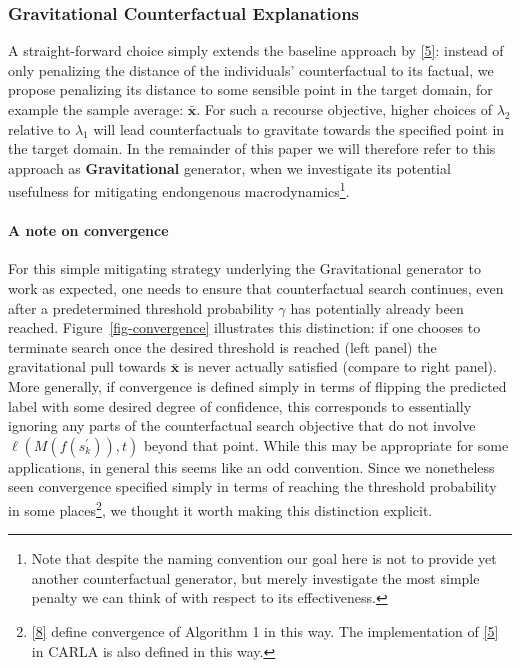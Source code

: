 \documentclass[
  conference]{IEEEtran}
\let\oldparagraph\paragraph
\renewcommand{\paragraph}[1]{\oldparagraph{#1}\mbox{}}
\begin{document}
\hypertarget{sec-empirical-2-mitigate}{%
\subsubsection{Gravitational Counterfactual
Explanations}\label{sec-empirical-2-mitigate}}

A straight-forward choice simply extends the baseline approach by
\protect\hyperlink{ref-wachter2017counterfactual}{{[}5{]}}: instead of
only penalizing the distance of the individuals' counterfactual to its
factual, we propose penalizing its distance to some sensible point in
the target domain, for example the sample average: \(\bar{\mathbf{x}}\).
For such a recourse objective, higher choices of \(\lambda_2\) relative
to \(\lambda_1\) will lead counterfactuals to gravitate towards the
specified point in the target domain. In the remainder of this paper we
will therefore refer to this approach as \textbf{Gravitational}
generator, when we investigate its potential usefulness for mitigating
endongenous macrodynamics\footnote{Note that despite the naming
  convention our goal here is not to provide yet another counterfactual
  generator, but merely investigate the most simple penalty we can think
  of with respect to its effectiveness.}.

\hypertarget{a-note-on-convergence}{%
\paragraph{A note on convergence}\label{a-note-on-convergence}}

For this simple mitigating strategy underlying the Gravitational
generator to work as expected, one needs to ensure that counterfactual
search continues, even after a predetermined threshold probability
\(\gamma\) has potentially already been reached.
Figure~\ref{fig-convergence} illustrates this distinction: if one
chooses to terminate search once the desired threshold is reached (left
panel) the gravitational pull towards \(\bar{\mathbf{x}}\) is never
actually satisfied (compare to right panel). More generally, if
convergence is defined simply in terms of flipping the predicted label
with some desired degree of confidence, this corresponds to essentially
ignoring any parts of the counterfactual search objective that do not
involve \(\ell(M(f(s_k^\prime)),t)\) beyond that point. While this may
be appropriate for some applications, in general this seems like an odd
convention. Since we nonetheless seen convergence specified simply in
terms of reaching the threshold probability in some places\footnote{\protect\hyperlink{ref-joshi2019towards}{{[}8{]}}
  define convergence of Algorithm 1 in this way. The implementation of
  \protect\hyperlink{ref-wachter2017counterfactual}{{[}5{]}} in CARLA is
  also defined in this way.}, we thought it worth making this
distinction explicit.
\end{document}
